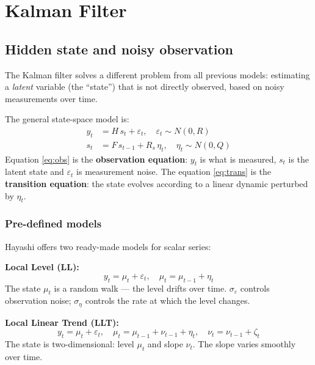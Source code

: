 \chapter{Kalman Filter}
\label{cap:kalman}

\section{Hidden state and noisy observation}

The Kalman filter solves a different problem from all previous models:
estimating a \emph{latent} variable (the ``state'') that is not directly
observed, based on noisy measurements over time.

The general state-space model is:
\begin{align}
  y_t   &= H\, s_t + \varepsilon_t, \quad \varepsilon_t \sim N(0, R) \label{eq:obs}\\
  s_t   &= F\, s_{t-1} + R_s\, \eta_t, \quad \eta_t \sim N(0, Q) \label{eq:trans}
\end{align}
Equation \eqref{eq:obs} is the \textbf{observation equation}: $y_t$ is what is
measured, $s_t$ is the latent state and $\varepsilon_t$ is measurement noise. The
equation \eqref{eq:trans} is the \textbf{transition equation}: the state evolves
according to a linear dynamic perturbed by $\eta_t$.

\subsection*{Pre-defined models}

Hayashi offers two ready-made models for scalar series:

\medskip
\textbf{Local Level (LL):}
\[
  y_t = \mu_t + \varepsilon_t, \quad
  \mu_t = \mu_{t-1} + \eta_t
\]
The state $\mu_t$ is a random walk — the level drifts over time.
$\sigma_\varepsilon$ controls observation noise; $\sigma_\eta$ controls
the rate at which the level changes.

\medskip
\textbf{Local Linear Trend (LLT):}
\[
  y_t = \mu_t + \varepsilon_t, \quad
  \mu_t = \mu_{t-1} + \nu_{t-1} + \eta_t, \quad
  \nu_t = \nu_{t-1} + \zeta_t
\]
The state is two-dimensional: level $\mu_t$ and slope $\nu_t$.
The slope varies smoothly over time.

